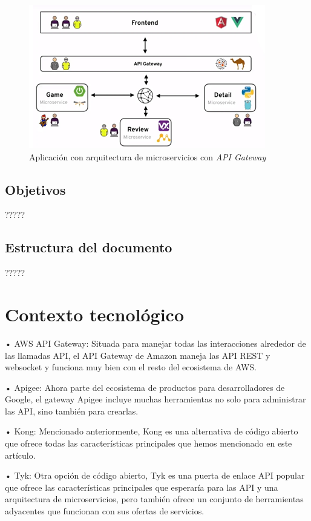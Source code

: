 \documentclass[11pt,spanish,listoffigures]{tfgetsinf}
\begin{document}
\begin{figure}
	\centering
	\includegraphics{images/arquitecturaMicroserviciosConGateway}
	\caption{Aplicación con arquitectura de microservicios con \emph{API Gateway}}
\end{figure}

\section{Objetivos}

?????

\section{Estructura del documento}

?????


\chapter{Contexto tecnológico}

•	AWS API Gateway: Situada para manejar todas las interacciones alrededor de las llamadas API, el API Gateway de Amazon maneja las API REST y websocket y funciona muy bien con el resto del ecosistema de AWS.

•	Apigee: Ahora parte del ecosistema de productos para desarrolladores de Google, el gateway Apigee incluye muchas herramientas no solo para administrar las API, sino también para crearlas.

•	Kong: Mencionado anteriormente, Kong es una alternativa de código abierto que ofrece todas las características principales que hemos mencionado en este artículo.

•	Tyk: Otra opción de código abierto, Tyk es una puerta de enlace API popular que ofrece las características principales que esperaría para las API y una arquitectura de microservicios, pero también ofrece un conjunto de herramientas adyacentes que funcionan con sus ofertas de servicios.
\end{document}
